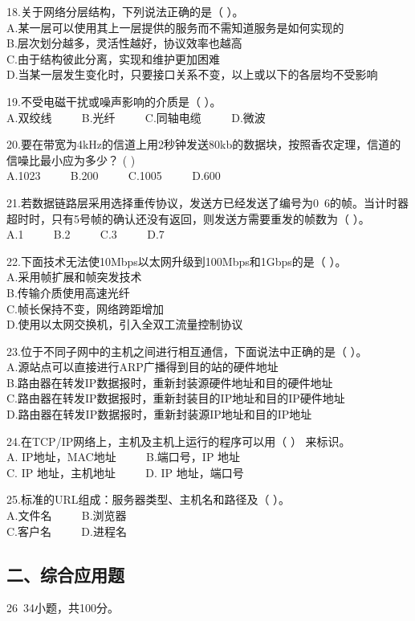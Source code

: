 18.关于网络分层结构，下列说法正确的是（    ）。 \\
A.某一层可以使用其上一层提供的服务而不需知道服务是如何实现的 \\
B.层次划分越多，灵活性越好，协议效率也越高 \\
C.由于结构彼此分离，实现和维护更加困难 \\
D.当某一层发生变化时，只要接口关系不变，以上或以下的各层均不受影响

19.不受电磁干扰或噪声影响的介质是（    ）。 \\
A.双绞线 $\qquad$ B.光纤 $\qquad$ C.同轴电缆 $\qquad$ D.微波

20.要在带宽为4kHz的信道上用2秒钟发送80kb的数据块，按照香农定理，信道的信噪比最小应为多少？ (    ) \\
A.1023 $\qquad$ B.200 $\qquad$ C.1005 $\qquad$ D.600

21.若数据链路层采用选择重传协议，发送方已经发送了编号为0~6的帧。当计时器超时时，只有5号帧的确认还没有返回，则发送方需要重发的帧数为（    ）。 \\
A.1 $\qquad$ B.2 $\qquad$ C.3 $\qquad$ D.7

22.下面技术无法使10Mbps以太网升级到100Mbps和1Gbps的是（ ）。 \\
A.采用帧扩展和帧突发技术 \\
B.传输介质使用高速光纤 \\
C.帧长保持不变，网络跨距增加 \\
D.使用以太网交换机，引入全双工流量控制协议

23.位于不同子网中的主机之间进行相互通信，下面说法中正确的是（ ）。 \\
A.源站点可以直接进行ARP广播得到目的站的硬件地址 \\
B.路由器在转发IP数据报时，重新封装源硬件地址和目的硬件地址 \\
C.路由器在转发IP数据报时，重新封装目的IP地址和目的IP硬件地址 \\
D.路由器在转发IP数据报时，重新封装源IP地址和目的IP地址

24.在TCP/IP网络上，主机及主机上运行的程序可以用（ ） 来标识。 \\
A. IP地址，MAC地址 $\qquad$ B.端口号，IP 地址 \\
C. IP 地址，主机地址 $\qquad$ D. IP 地址，端口号

25.标准的URL组成：服务器类型、主机名和路径及（ ）。 \\
A.文件名 $\qquad$ B.浏览器 \\
C.客户名 $\qquad$ D.进程名

\subsection{二、综合应用题}
26~34小题，共100分。

